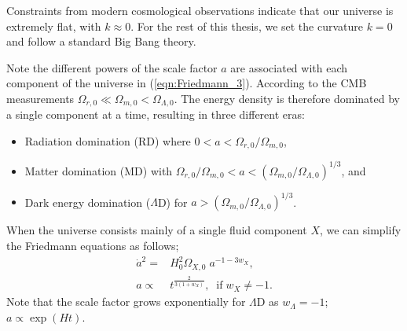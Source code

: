 Constraints from modern cosmological observations indicate that our universe is extremely flat, with $k\approx 0$. For the rest of this thesis, we set the curvature $k=0$ and follow a standard Big Bang theory.

Note the different powers of the scale factor $a$ are associated with each component of the universe in (\ref{eqn:Friedmann_3}). According to the CMB measurements $\Omega_{r,0} \ll \Omega_{m,0} < \Omega_{\Lambda,0}$. The energy density is therefore dominated by a single component at a time, resulting in three different eras:
\begin{itemize}
	\item Radiation domination (RD) where $0 < a < \Omega_{r,0}/\Omega_{m,0}$,
	\item Matter domination (MD) with $\Omega_{r,0}/\Omega_{m,0} < a < (\Omega_{m,0}/\Omega_{\Lambda,0})^{1/3}$, and
	\item Dark energy domination ($\Lambda$D) for $a > (\Omega_{m,0}/\Omega_{\Lambda,0})^{1/3}$.
\end{itemize}
When the universe consists mainly of a single fluid component $X$, we can simplify the Friedmann equations as follows;
\begin{align}
	\dot{a}^2 =& H_0^2 \Omega_{X,0} \; a^{-1-3w_X}, \label{eqn:Friedmann_single_fluid}\\
	a \propto& t^\frac{2}{3(1+w_X)}, \;\; \text{if} \; w_X \neq -1.
\end{align}
Note that the scale factor grows exponentially for $\Lambda$D as $w_\Lambda=-1$; $a\propto \exp(Ht)$.

